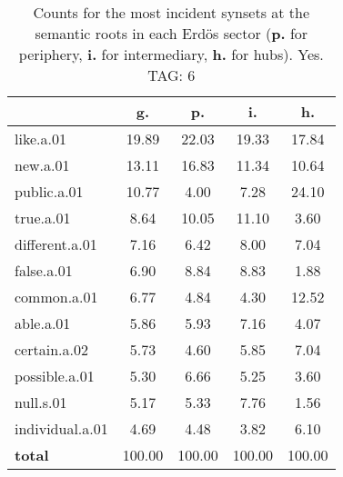 \begin{table}[h!]
\begin{center}
\begin{tabular}{| l || c | c | c | c |}\hline
 & {\bf g.} & {\bf p.} & {\bf i.} & {\bf h.} \\\hline\hline
like.a.01 & 19.89  & 22.03  & 19.33  & 17.84 \\\hline
new.a.01 & 13.11  & 16.83  & 11.34  & 10.64 \\\hline
public.a.01 & 10.77  & 4.00  & 7.28  & 24.10 \\\hline
true.a.01 & 8.64  & 10.05  & 11.10  & 3.60 \\\hline
different.a.01 & 7.16  & 6.42  & 8.00  & 7.04 \\\hline
false.a.01 & 6.90  & 8.84  & 8.83  & 1.88 \\\hline
common.a.01 & 6.77  & 4.84  & 4.30  & 12.52 \\\hline
able.a.01 & 5.86  & 5.93  & 7.16  & 4.07 \\\hline
certain.a.02 & 5.73  & 4.60  & 5.85  & 7.04 \\\hline
possible.a.01 & 5.30  & 6.66  & 5.25  & 3.60 \\\hline
null.s.01 & 5.17  & 5.33  & 7.76  & 1.56 \\\hline
individual.a.01 & 4.69  & 4.48  & 3.82  & 6.10 \\\hline\hline
{{\bf total}} & 100.00  & 100.00  & 100.00  & 100.00 \\\hline
\end{tabular}
\caption{Counts for the most incident synsets at the semantic roots in each Erd\"os sector ({\bf p.} for periphery, {\bf i.} for intermediary, {\bf h.} for hubs). Yes. TAG: 6}
\end{center}
\end{table}